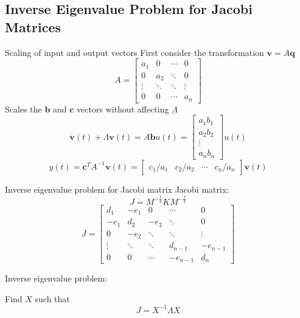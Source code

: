 \documentclass{beamer}
\begin{document}
\subsection{Inverse Eigenvalue Problem for Jacobi Matrices}
\begin{frame}{Scaling of input and output vectors}
First consider the transformation $\mathbf{v} = A \mathbf{q}$
$$A = \begin{bmatrix}
a_1  &  0 & \cdots & 0 \\
0 & a_2  & \ddots & 0 \\
\vdots & \ddots & \ddots & \vdots \\
0 & 0 & \cdots & a_n \end{bmatrix}$$
Scales the $\mathbf{b}$ and $\mathbf{c}$ vectors without affecting $\Lambda$
\begin{equation}
\ddot{\mathbf{v}}(t) +  \Lambda \mathbf{v}(t) =  A \mathbf{b}u(t) =  \begin{bmatrix} a_1 b_1 \\ a_2 b_2 \\ \vdots \\ a_n b_n  \end{bmatrix} u(t)
\label{eq:scaled1}
\end{equation}
\begin{equation}
y(t) = \mathbf{c}^T  A^{-1} \mathbf{v}(t) = \begin{bmatrix} c_1/a_1 &  c_2/a_2 & \cdots & c_n/a_n \end{bmatrix} \mathbf{v}(t)
\label{eq:scaled2}
\end{equation}
\end{frame}

\begin{frame}{Inverse eigenvalue problem for Jacobi matrix}
Jacobi matrix:
$$J =  M^{-\frac{1}{2}} K M^{-\frac{1}{2}}$$
\vspace{0.5cm}
$$
J = \begin{bmatrix} d_1  &  -e_1 & 0 & \cdots & 0 \\
-e_1 & d_2  & -e_2 & \ddots & 0 \\
0 & -e_2 & \ddots & \ddots & \vdots \\
\vdots & \ddots & \ddots & d_{n-1} & -e_{n-1} \\
0 & 0 & \cdots & -e_{n-1} & d_n \end{bmatrix}
$$

Inverse eigenvalue problem:

Find $X$ such that $$J = X^{-1} \Lambda X$$
\end{frame}
\end{document}
